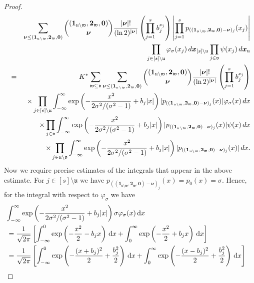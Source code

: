 \documentclass[10pt,a4paper]{amsart}
\newcommand{\bsnu}{\boldsymbol{\nu}}
\newcommand{\bsone}{\boldsymbol{1}}
\newcommand{\bstwo}{\boldsymbol{2}}
\newcommand{\bsx}{\boldsymbol{x}}
\newcommand{\bszero}{\boldsymbol{0}}
\newcommand{\rd}{\, {\rm d}}
\newcommand{\uu}{\mathfrak{u}}
\newcommand{\vv}{\mathfrak{v}}
\newcommand{\ww}{\mathfrak{w}}
\begin{document}
\begin{proof}
\begin{eqnarray*}
& & \sum_{\bsnu \le (\bsone_{\uu \setminus \ww},\bstwo_{\ww},\bszero)} {(\bsone_{\uu \setminus \ww},\bstwo_{\ww},\bszero) \choose \bsnu} \frac{|\bsnu|!}{(\ln 2)^{|\bsnu|}} \left(\prod_{j=1}^s b_j^{\nu_j}\right)  \left| \prod_{j=1}^s p_{((\bsone_{\uu \setminus \ww},\bstwo_{\ww},\bszero) -\bsnu)_j}(x_j)\right| \\
& & \prod_{j \in [s]\setminus \uu} \varphi_{\sigma}(x_j) \rd \bsx_{[s] \setminus \uu}   \prod_{j \in \vv} \psi(x_j)     \rd \bsx_{\uu}\\
& = & K^{\ast} \sum_{\ww \subseteq \vv} \sum_{\bsnu \le (\bsone_{\uu \setminus \ww},\bstwo_{\ww},\bszero)} {(\bsone_{\uu \setminus \ww},\bstwo_{\ww},\bszero) \choose \bsnu} \frac{|\bsnu|!}{(\ln 2)^{|\bsnu|}} \left(\prod_{j=1}^s b_j^{\nu_j}\right) \\
&& \times  \prod_{j \in [s]\setminus \uu} \int_{-\infty}^{\infty} \exp\left(-\frac{x^2}{2 \sigma^2/(\sigma^2-1)} +b_j|x|\right) |p_{((\bsone_{\uu \setminus \ww},\bstwo_{\ww},\bszero) -\bsnu)_j}(x)| \varphi_{\sigma}(x) \rd x \\
&& \times \prod_{j \in \vv} \int_{-\infty}^{\infty} \exp\left(-\frac{x^2}{2 \sigma^2/(\sigma^2-1)} +b_j|x|\right) |p_{((\bsone_{\uu \setminus \ww},\bstwo_{\ww},\bszero) -\bsnu)_j}(x)| \psi(x) \rd x \\
&& \times \prod_{j \in \uu \setminus\vv} \int_{-\infty}^{\infty} \exp\left(-\frac{x^2}{2 \sigma^2/(\sigma^2-1)} +b_j|x|\right) |p_{((\bsone_{\uu \setminus \ww},\bstwo_{\ww},\bszero) -\bsnu)_j}(x)|  \rd x.
\end{eqnarray*}
Now we require precise estimates of the integrals that appear in the above estimate. For $j \in [s]\setminus \uu$ we have $p_{((\bsone_{\uu \setminus \ww},\bstwo_{\ww},\bszero) -\bsnu)_j}(x)=p_0(x)=\sigma$. Hence, for the integral with respect to $\varphi_\sigma$ we have 
\begin{align}\label{est:int1}
\lefteqn{\int_{-\infty}^{\infty} \exp\left(-\frac{x^2}{2 \sigma^2/(\sigma^2-1)} +b_j|x|\right) \sigma \varphi_{\sigma}(x) \,\mathrm{d} x}\nonumber\\
&= \frac{1}{\sqrt{2 \pi}} \left[\int_{-\infty}^0 \exp\left(- \frac{x^2}{2} - b_j x\right)  \,\mathrm{d} x +  \int_0^{\infty} \exp\left(-\frac{x^2}{2} +b_j x\right) \,\mathrm{d} x \right]\nonumber\\
&= \frac{1}{\sqrt{2 \pi}} \left[\int_{-\infty}^0 \exp\left(-\frac{(x+b_j)^2}{2} + \frac{b_j^2}{2} \right)  \,\mathrm{d} x +\int_0^{\infty} \exp\left(-\frac{(x-b_j)^2}{2} + \frac{b_j^2}{2} \right)  \,\mathrm{d} x \right]\nonumber\\

\end{align}
\end{proof}
\end{document}
